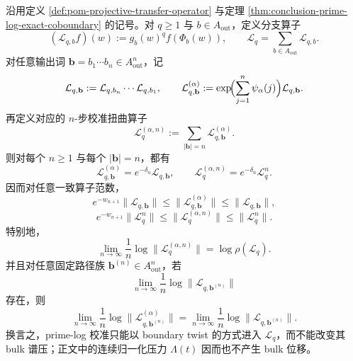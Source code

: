 \begin{theorem}\label{thm:conclusion-prime-log-boundary-twist-pressure-invariance}
沿用定义 \ref{def:pom-projective-transfer-operator} 与定理 \ref{thm:conclusion-prime-log-exact-coboundary} 的记号。对 \(q\ge 1\) 与 \(b\in A_{\mathrm{out}}\)，定义分支算子
\[
(\mathcal L_{q,b}f)(w):=g_b(w)^q f(\Phi_b(w)),
\qquad
\mathcal L_q=\sum_{b\in A_{\mathrm{out}}}\mathcal L_{q,b}.
\]
对任意输出词 \(\mathbf b=b_1\cdots b_n\in A_{\mathrm{out}}^n\)，记
\[
\mathcal L_{q,\mathbf b}:=\mathcal L_{q,b_n}\cdots \mathcal L_{q,b_1},
\qquad
\mathcal L_{q,\mathbf b}^{(\alpha)}
:=
\exp\!\Bigl(\sum_{j=1}^{n}\psi_\alpha(j)\Bigr)\mathcal L_{q,\mathbf b}.
\]
再定义对应的 \(n\)-步校准扭曲算子
\[
\mathcal L_q^{(\alpha,n)}
:=
\sum_{|\mathbf b|=n}\mathcal L_{q,\mathbf b}^{(\alpha)}.
\]
则对每个 \(n\ge 1\) 与每个 \(|\mathbf b|=n\)，都有
\[
\mathcal L_{q,\mathbf b}^{(\alpha)}=e^{-\delta_n}\mathcal L_{q,\mathbf b},
\qquad
\mathcal L_q^{(\alpha,n)}=e^{-\delta_n}\mathcal L_q^n.
\]
因而对任意一致算子范数，
\[
e^{-w_{n+1}}\|\mathcal L_{q,\mathbf b}\|
\le
\|\mathcal L_{q,\mathbf b}^{(\alpha)}\|
\le
\|\mathcal L_{q,\mathbf b}\|,
\]
\[
e^{-w_{n+1}}\|\mathcal L_q^n\|
\le
\|\mathcal L_q^{(\alpha,n)}\|
\le
\|\mathcal L_q^n\|.
\]
特别地，
\[
\lim_{n\to\infty}\frac1n\log \|\mathcal L_q^{(\alpha,n)}\|
=
\log \rho(\mathcal L_q).
\]
并且对任意固定路径族 \(\mathbf b^{(n)}\in A_{\mathrm{out}}^n\)，若
\[
\lim_{n\to\infty}\frac1n\log \|\mathcal L_{q,\mathbf b^{(n)}}\|
\]
存在，则
\[
\lim_{n\to\infty}\frac1n\log \|\mathcal L_{q,\mathbf b^{(n)}}^{(\alpha)}\|
=
\lim_{n\to\infty}\frac1n\log \|\mathcal L_{q,\mathbf b^{(n)}}\|.
\]
换言之，prime-log 校准只能以 boundary twist 的方式进入 \(\mathcal L_q\)，而不能改变其 bulk 谱压；正文中的连续归一化压力 \(\Lambda(t)\) 因而也不产生 bulk 位移。
\end{theorem}
